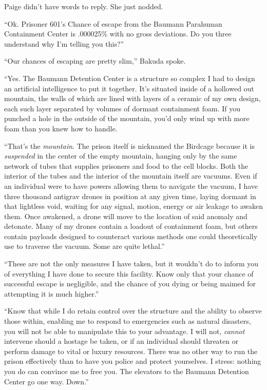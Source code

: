 Paige didn't have words to reply.  She just nodded.



``Ok.  Prisoner 601's Chance of escape from the Baumann Parahuman Containment Center is .000025\% with no gross deviations.  Do you three understand why I'm telling you this?''



``Our chances of escaping are pretty slim,'' Bakuda spoke.



``Yes.  The Baumann Detention Center is a structure so complex I had to design an artificial intelligence to put it together.  It's situated inside of a hollowed out mountain, the walls of which are lined with layers of a ceramic of my own design, each such layer separated by volumes of dormant containment foam.  If you punched a hole in the outside of the mountain, you'd only wind up with more foam than you knew how to handle.



``That's the \emph{mountain}.  The prison itself is nicknamed the Birdcage because it is \emph{suspended} in the center of the empty mountain, hanging only by the same network of tubes that supplies prisoners and food to the cell blocks.  Both the interior of the tubes and the interior of the mountain itself are vacuums.  Even if an individual were to have powers allowing them to navigate the vacuum, I have three thousand antigrav drones in position at any given time, laying dormant in that lightless void, waiting for any signal, motion, energy or air leakage to awaken them.  Once awakened, a drone will move to the location of said anomaly and detonate.  Many of my drones contain a loadout of containment foam, but others contain payloads designed to counteract various methods one could theoretically use to traverse the vacuum.  Some are quite lethal.''



``These are not the only measures I have taken, but it wouldn't do to inform you of everything I have done to secure this facility.  Know only that your chance of successful escape is negligible, and the chance of you dying or being maimed for attempting it is much higher.''



``Know that while I do retain control over the structure and the ability to observe those within, enabling me to respond to emergencies such as natural disasters, you will not be able to manipulate this to your advantage.  I will not, \emph{cannot} intervene should a hostage be taken, or if an individual should threaten or perform damage to vital or luxury resources.  There was no other way to run the prison effectively than to have you police and protect yourselves.  I stress: nothing you do can convince me to free you.  The elevators to the Baumann Detention Center go one way.  Down.''



